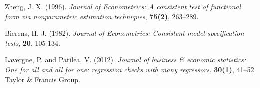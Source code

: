 \documentclass[12pt]{article}
\begin{document}
\begin{description}
\item
Zheng, J. X. (1996).
\textit{Journal of Econometrics: A consistent test of functional form via nonparametric estimation techniques},
\textbf{75(2)}, 263--289.

\item
Bierens, H. J. (1982).
\textit{Journal of Econometrics: Consistent model specification tests},
\textbf{20}, 105-134.

\item
Lavergne, P. and Patilea, V. (2012).
\textit{Journal of business \& economic statistics: One for all and all for one: regression checks with many regressors.}
\textbf{30(1)}, 41--52. 
Taylor \& Francis Group.



\end{description}
\end{document}

